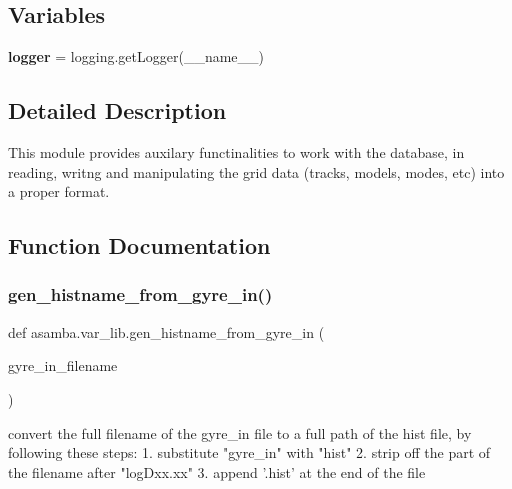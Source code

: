 \subsection*{Variables}
\begin{DoxyCompactItemize}
\item 
\mbox{\label{namespaceasamba_1_1var__lib_a4a857821fd66e66add3bfe64d1dae4fc}} 
{\bfseries logger} = logging.\+get\+Logger(\+\_\+\+\_\+name\+\_\+\+\_\+)
\end{DoxyCompactItemize}


\subsection{Detailed Description}
\begin{DoxyVerb}This module provides auxilary functinalities to work with the database, in reading, writng and 
manipulating the grid data (tracks, models, modes, etc) into a proper format. 
\end{DoxyVerb}
 

\subsection{Function Documentation}
\mbox{\label{namespaceasamba_1_1var__lib_a1d691c904bf7b6452533eb7649170747}} 
\subsubsection{\texorpdfstring{gen\+\_\+histname\+\_\+from\+\_\+gyre\+\_\+in()}{gen\_histname\_from\_gyre\_in()}}
{\footnotesize\ttfamily def asamba.\+var\+\_\+lib.\+gen\+\_\+histname\+\_\+from\+\_\+gyre\+\_\+in (\begin{DoxyParamCaption}\item[{}]{gyre\+\_\+in\+\_\+filename }\end{DoxyParamCaption})}

\begin{DoxyVerb}convert the full filename of the gyre_in file to a full path of the hist file, by following these 
steps:
1. substitute "gyre_in" with "hist"
2. strip off the part of the filename after "logDxx.xx" 
3. append '.hist' at the end of the file
\end{DoxyVerb}
 

